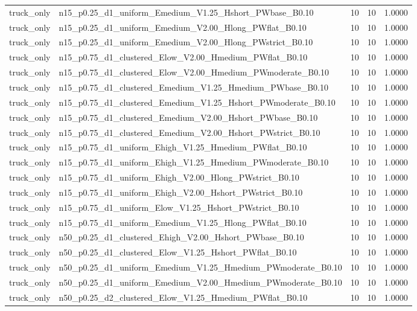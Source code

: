 \begin{tabular}{llrrr}
truck_only & n15_p0.25_d1_uniform_Emedium_V1.25_Hshort_PWbase_B0.10 & 10 & 10 & 1.0000 \\
truck_only & n15_p0.25_d1_uniform_Emedium_V2.00_Hlong_PWflat_B0.10 & 10 & 10 & 1.0000 \\
truck_only & n15_p0.25_d1_uniform_Emedium_V2.00_Hlong_PWstrict_B0.10 & 10 & 10 & 1.0000 \\
truck_only & n15_p0.75_d1_clustered_Elow_V2.00_Hmedium_PWflat_B0.10 & 10 & 10 & 1.0000 \\
truck_only & n15_p0.75_d1_clustered_Elow_V2.00_Hmedium_PWmoderate_B0.10 & 10 & 10 & 1.0000 \\
truck_only & n15_p0.75_d1_clustered_Emedium_V1.25_Hmedium_PWbase_B0.10 & 10 & 10 & 1.0000 \\
truck_only & n15_p0.75_d1_clustered_Emedium_V1.25_Hshort_PWmoderate_B0.10 & 10 & 10 & 1.0000 \\
truck_only & n15_p0.75_d1_clustered_Emedium_V2.00_Hshort_PWbase_B0.10 & 10 & 10 & 1.0000 \\
truck_only & n15_p0.75_d1_clustered_Emedium_V2.00_Hshort_PWstrict_B0.10 & 10 & 10 & 1.0000 \\
truck_only & n15_p0.75_d1_uniform_Ehigh_V1.25_Hmedium_PWflat_B0.10 & 10 & 10 & 1.0000 \\
truck_only & n15_p0.75_d1_uniform_Ehigh_V1.25_Hmedium_PWmoderate_B0.10 & 10 & 10 & 1.0000 \\
truck_only & n15_p0.75_d1_uniform_Ehigh_V2.00_Hlong_PWstrict_B0.10 & 10 & 10 & 1.0000 \\
truck_only & n15_p0.75_d1_uniform_Ehigh_V2.00_Hshort_PWstrict_B0.10 & 10 & 10 & 1.0000 \\
truck_only & n15_p0.75_d1_uniform_Elow_V1.25_Hshort_PWstrict_B0.10 & 10 & 10 & 1.0000 \\
truck_only & n15_p0.75_d1_uniform_Emedium_V1.25_Hlong_PWflat_B0.10 & 10 & 10 & 1.0000 \\
truck_only & n50_p0.25_d1_clustered_Ehigh_V2.00_Hshort_PWbase_B0.10 & 10 & 10 & 1.0000 \\
truck_only & n50_p0.25_d1_clustered_Elow_V1.25_Hshort_PWflat_B0.10 & 10 & 10 & 1.0000 \\
truck_only & n50_p0.25_d1_uniform_Emedium_V1.25_Hmedium_PWmoderate_B0.10 & 10 & 10 & 1.0000 \\
truck_only & n50_p0.25_d1_uniform_Emedium_V2.00_Hmedium_PWmoderate_B0.10 & 10 & 10 & 1.0000 \\
truck_only & n50_p0.25_d2_clustered_Elow_V1.25_Hmedium_PWflat_B0.10 & 10 & 10 & 1.0000 \\

\end{tabular}
